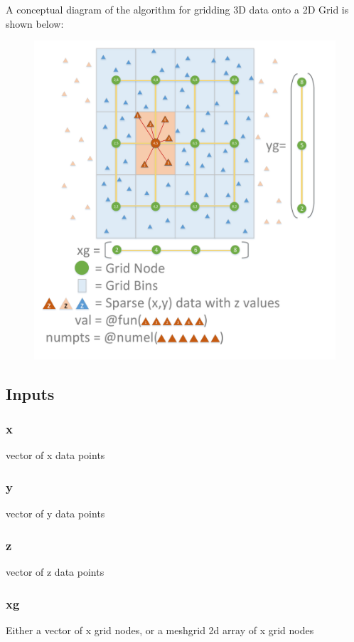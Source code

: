 \documentclass{article}
\begin{document}
A conceptual diagram of the algorithm for gridding 3D data onto a 2D Grid is shown below:
\begin{figure}[H]
	\centering
	\includegraphics[width = \linewidth]{roundgridfunmaplabels}
\end{figure}

\subsection{Inputs}
\subsubsection{x}
vector of x data points

\subsubsection{y}
vector of y data points

\subsubsection{z}
vector of z data points

\subsubsection{xg}
Either a vector of x grid nodes, or a meshgrid 2d array of x grid nodes
\end{document}
